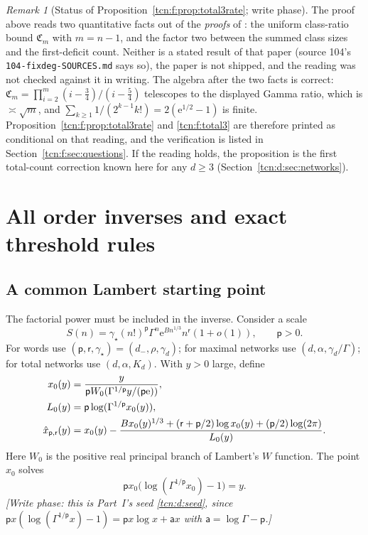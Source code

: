 \documentclass[11pt,letterpaper]{article}
\newcommand{\ee}{\mathrm e}
\theoremstyle{remark}
\newtheorem{remark}[theorem]{Remark}
\begin{document}
\begin{remark}[Status of Proposition~\ref{tcn:f:prop:total3rate}; write phase]\label{tcn:f:rem:reading}
The proof above reads two quantitative facts out of the \emph{proofs} of \cite[Lemma 3.24 and Theorem 1.9(ii)]{Chang2024}: the uniform class-ratio bound $\mathfrak C_m$ with $m=n-1$, and the factor two between the summed class sizes and the first-deficit count. Neither is a stated result of that paper (source 104's \textup{\nolinkurl{104-fixdeg-SOURCES.md}} says so), the paper is not shipped, and the reading was not checked against it in writing. The algebra after the two facts is correct: $\mathfrak C_m=\prod_{i=2}^m(i-\frac34)/(i-\frac54)$ telescopes to the displayed Gamma ratio, which is $\asymp\sqrt m$, and $\sum_{k\ge1}1/(2^{k-1}k!)=2(\ee^{1/2}-1)$ is finite. Proposition~\ref{tcn:f:prop:total3rate} and \eqref{tcn:f:total3} are therefore printed as conditional on that reading, and the verification is listed in Section~\ref{tcn:f:sec:questions}. If the reading holds, the proposition is the first total-count correction known here for any $d\ge3$ (Section~\ref{tcn:d:sec:networks}).
\end{remark}

\section{All order inverses and exact threshold rules}\label{tcn:f:sec:inverse}
\subsection{A common Lambert starting point}
The factorial power must be included in the inverse. Consider a scale
\[
 S(n)=\gamma_\star(n!)^{\mathsf p}\Gamma^n\ee^{Bn^{1/3}}n^{\mathsf r}(1+o(1)),\qquad \mathsf p>0.
\]
For words use $(\mathsf p,\mathsf r,\gamma_\star)=(d_-,\rho,\gamma_d)$; for maximal networks use $(d,\alpha,\gamma_d/\Gamma)$; for total networks use $(d,\alpha,K_d)$. With $y>0$ large, define
\begin{align}
 x_0(y)&=\frac{y}{\mathsf pW_0(\Gamma^{1/\mathsf p}y/(\mathsf p\ee))},\label{tcn:f:lambert}\\
 L_0(y)&=\mathsf p\log(\Gamma^{1/\mathsf p}x_0(y)),\notag\\
 \hat x_{\mathsf p,\mathsf r}(y)&=x_0(y)-
 \frac{Bx_0(y)^{1/3}+(\mathsf r+\mathsf p/2)\log x_0(y)
                     +(\mathsf p/2)\log(2\pi)}{L_0(y)}.\label{tcn:f:amplitudefree}
\end{align}
Here $W_0$ is the positive real principal branch of Lambert's $W$ function. The point $x_0$ solves
\[
 \mathsf px_0\bigl(\log(\Gamma^{1/\mathsf p}x_0)-1\bigr)=y.
\]
\emph{[Write phase: this is Part~I's seed \eqref{tcn:d:seed}, since $\mathsf px(\log(\Gamma^{1/\mathsf p}x)-1)=\mathsf px\log x+\mathsf ax$ with $\mathsf a=\log\Gamma-\mathsf p$.]}
\end{document}
